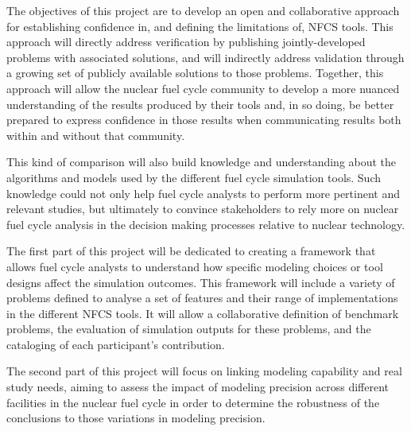 The objectives of this project are to develop an open and collaborative
approach for establishing confidence in, and defining the limitations of, NFCS
tools.  This approach will directly address verification by publishing
jointly-developed problems with associated solutions, and will indirectly
address validation through a growing set of publicly available solutions to
those problems.  Together, this approach will allow the nuclear fuel cycle
community to develop a more nuanced understanding of the results produced by
their tools and, in so doing, be better prepared to express confidence in
those results when communicating results both within and without that
community.

This kind of comparison will also build
knowledge and understanding about the algorithms and models used by the
different fuel cycle simulation tools. Such knowledge could not only help fuel
cycle analysts to perform more pertinent and relevant studies, but ultimately to
convince stakeholders to rely more on nuclear fuel cycle analysis in the
decision making processes relative to nuclear technology.


The first part of this project will be dedicated to creating a framework that allows
fuel cycle analysts to understand how specific modeling choices or tool designs
affect the simulation outcomes. This framework will include a variety of
problems defined to analyse a set of features and their range of implementations
in the different NFCS tools. It will allow a collaborative definition of
benchmark problems, the evaluation of simulation outputs for these problems, and
the cataloging of each participant’s contribution.

The second part of this project will focus on linking modeling capability and
real study needs, aiming to assess the impact of modeling precision across
different facilities in the nuclear fuel cycle in order to determine the
robustness of the conclusions to those variations in modeling precision.


